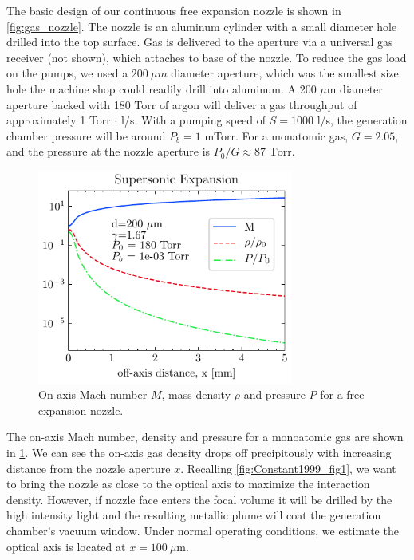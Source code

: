 The basic design of our continuous free expansion nozzle is shown in \cref{fig:gas_nozzle}. The nozzle is an aluminum cylinder with a small diameter hole drilled into the top surface. Gas is delivered to the aperture via a universal gas receiver (not shown), which attaches to base of the nozzle. To reduce the gas load on the pumps, we used a $200 \ \mu m$ diameter aperture, which was the smallest size hole the machine shop could readily drill into aluminum. A 200 $\mu$m diameter aperture backed with 180 Torr of argon will deliver a gas throughput of approximately {1 Torr $\cdot$ l/s}. With a pumping speed of $S = 1000$ l/s, the generation chamber pressure will be around $P_b = 1$ mTorr. For a monatomic gas, $G = 2.05$, and the pressure at the nozzle aperture is $P_0/G \approx 87 \textrm{ Torr}$.

\begin{figure}
	\centering
	\includegraphics[width=0.75\textwidth]{figures/chap3/M_rho_P_vs_x.pdf}
	\caption{On-axis Mach number $M$, mass density $\rho$ and pressure $P$ for a free expansion nozzle.}
	\label{fig:M_rho_vs_x}
\end{figure}


The on-axis Mach number, density and pressure for a monoatomic gas are shown in \cref{fig:M_rho_vs_x}. We can see the on-axis gas density drops off precipitously with increasing distance from the nozzle aperture $x$. Recalling \cref{fig:Constant1999_fig1}, we want to bring the nozzle as close to the optical axis to maximize the interaction density. However, if nozzle face enters the focal volume it will be drilled by the high intensity light and the resulting metallic plume will coat the generation chamber's vacuum window. Under normal operating conditions, we estimate the optical axis is located at $x=100 \ \mu$m.

